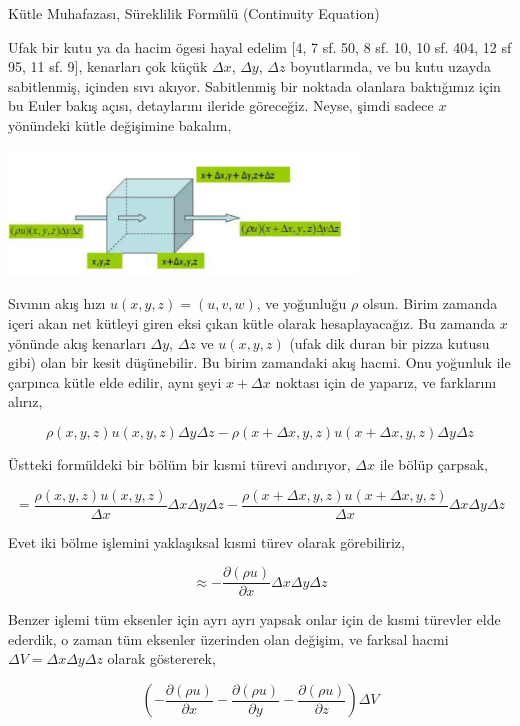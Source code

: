 \documentclass[12pt,fleqn]{article}\usepackage{../../common}
\begin{document}
Kütle Muhafazası, Süreklilik Formülü (Continuity Equation)

Ufak bir kutu ya da hacim ögesi hayal edelim [4, 7 sf. 50, 8 sf. 10, 10 sf. 404, 12
  sf 95, 11 sf. 9], kenarları çok küçük $\Delta x$, $\Delta y$, $\Delta z$
boyutlarında, ve bu kutu uzayda sabitlenmiş, içinden sıvı akıyor. Sabitlenmiş
bir noktada olanlara baktığımız için bu Euler bakış açısı, detaylarını ileride
göreceğiz. Neyse, şimdi sadece $x$ yönündeki kütle değişimine bakalım,

\includegraphics[width=25em]{phy_050_cons_03.png}

Sıvının akış hızı $u(x,y,z) = (u,v,w)$, ve yoğunluğu $\rho$ olsun. Birim zamanda
içeri akan net kütleyi giren eksi çıkan kütle olarak hesaplayacağız. Bu zamanda
$x$ yönünde akış kenarları $\Delta y$, $\Delta z$ ve $u(x,y,z)$ (ufak dik duran
bir pizza kutusu gibi) olan bir kesit düşünebilir. Bu birim zamandaki akış
hacmi.  Onu yoğunluk ile çarpınca kütle elde edilir, aynı şeyi $x + \Delta x$
noktası için de yaparız, ve farklarını alırız,

$$
\rho(x,y,z)u(x,y,z)\Delta y \Delta z -
\rho(x+\Delta x,y,z) u(x+\Delta x,y,z)\Delta y \Delta z
$$

Üstteki formüldeki bir bölüm bir kısmi türevi andırıyor, $\Delta x$ ile bölüp
çarpsak,

$$
= \frac{\rho(x,y,z)u(x,y,z)}{\Delta x}\Delta x \Delta y \Delta z -
\frac{\rho(x+\Delta x,y,z) u(x+\Delta x,y,z)}{\Delta x} \Delta x \Delta y \Delta z
$$

Evet iki bölme işlemini yaklaşıksal kısmi türev olarak görebiliriz,

$$
\approx -\frac{\partial (\rho u) }{\partial x} \Delta x \Delta y \Delta z
$$

Benzer işlemi tüm eksenler için ayrı ayrı yapsak onlar için de kısmi türevler
elde ederdik, o zaman tüm eksenler üzerinden olan değişim, ve farksal hacmi
$\Delta V = \Delta x \Delta y \Delta z$ olarak göstererek,

$$
\left(
-\frac{\partial (\rho u) }{\partial x} 
-\frac{\partial (\rho u) }{\partial y} 
-\frac{\partial (\rho u) }{\partial z} 
\right) \Delta V
$$
\end{document}
